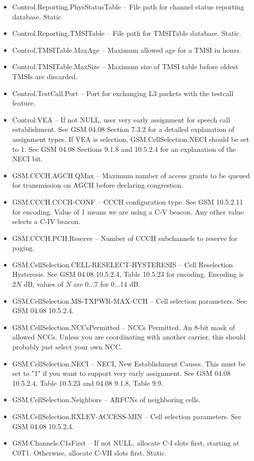 \documentclass[11pt,openany]{book}
\begin{document}
\begin{itemize}
\item Control.Reporting.PhysStatusTable -- File path for channel status reporting database.  Static.
\item Control.Reporting.TMSITable -- File path for TMSITable database.  Static.
\item Control.TMSITable.MaxAge -- Maximum allowed age for a TMSI in hours.
\item Control.TMSITable.MaxSize -- Maximum size of TMSI table before oldest TMSIs are discarded.
\item Control.TestCall.Port -- Port for exchanging L3 packets with the testcall feature.
\item Control.VEA -- If not NULL, user very early assignment for speech call establishment.  See GSM 04.08 Section 7.3.2 for a detailed explanation of assignment types. If VEA is selection, GSM.CellSelection.NECI should be set to 1.  See GSM 04.08 Sections 9.1.8 and 10.5.2.4 for an explanation of the NECI bit.
\item GSM.CCCH.AGCH.QMax -- Maximum number of access grants to be queued for transmission on AGCH before declaring congrestion.
\item GSM.CCCH.CCCH-CONF -- CCCH configuration type.  See GSM 10.5.2.11 for encoding.  Value of 1 means we are using a C-V beacon.  Any other value selects a C-IV beacon.
\item GSM.CCCH.PCH.Reserve -- Number of CCCH subchannels to reserve for paging.
\item GSM.CellSelection.CELL-RESELECT-HYSTERESIS -- Cell Reselection Hysteresis.  See GSM 04.08 10.5.2.4, Table 10.5.23 for encoding.  Encoding is $2N$ dB, values of $N$ are 0...7 for 0...14 dB.
\item GSM.CellSelection.MS-TXPWR-MAX-CCH -- Cell selection parameters.  See GSM 04.08 10.5.2.4.
\item GSM.CellSelection.NCCsPermitted -- NCCs Permitted.  An 8-bit mask of allowed NCCs.  Unless you are coordinating with another carrier, this should probably just select your own NCC.
\item GSM.CellSelection.NECI -- NECI, New Establishment Causes.  This must be set to "1" if you want to support very early assignment.  See GSM 04.08 10.5.2.4, Table 10.5.23 and 04.08 9.1.8, Table 9.9.
\item GSM.CellSelection.Neighbors -- ARFCNs of neighboring cells.
\item GSM.CellSelection.RXLEV-ACCESS-MIN -- Cell selection parameters.  See GSM 04.08 10.5.2.4.
\item GSM.Channels.C1sFirst -- If not NULL, allocate C-I slots first, starting at C0T1.  Otherwise, allocate C-VII slots first.  Static.

\end{itemize}
\end{document}
